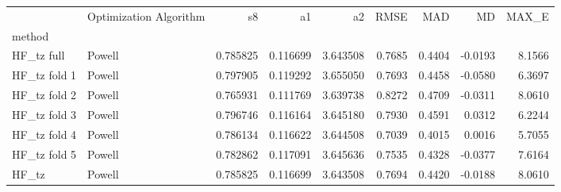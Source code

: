 \begin{tabular}{llrrrrrrr}
 & Optimization Algorithm & s8 & a1 & a2 & RMSE & MAD & MD & MAX_E \\
method &  &  &  &  &  &  &  &  \\
HF_tz full & Powell & 0.785825 & 0.116699 & 3.643508 & 0.7685 & 0.4404 & -0.0193 & 8.1566 \\
HF_tz fold 1 & Powell & 0.797905 & 0.119292 & 3.655050 & 0.7693 & 0.4458 & -0.0580 & 6.3697 \\
HF_tz fold 2 & Powell & 0.765931 & 0.111769 & 3.639738 & 0.8272 & 0.4709 & -0.0311 & 8.0610 \\
HF_tz fold 3 & Powell & 0.796746 & 0.116164 & 3.645180 & 0.7930 & 0.4591 & 0.0312 & 6.2244 \\
HF_tz fold 4 & Powell & 0.786134 & 0.116622 & 3.644508 & 0.7039 & 0.4015 & 0.0016 & 5.7055 \\
HF_tz fold 5 & Powell & 0.782862 & 0.117091 & 3.645636 & 0.7535 & 0.4328 & -0.0377 & 7.6164 \\
HF_tz & Powell & 0.785825 & 0.116699 & 3.643508 & 0.7694 & 0.4420 & -0.0188 & 8.0610 \\
\end{tabular}
